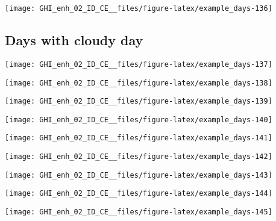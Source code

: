 \documentclass[
  10pt,
  a4paper,oneside]{article}
\begin{document}
\begin{center}\texttt{[image: GHI\_enh\_02\_ID\_CE\_\_files/figure-latex/example\_days-136]} \end{center}

\FloatBarrier

\hypertarget{days-with-cloudy-day}{%
\subsection{Days with cloudy day}\label{days-with-cloudy-day}}

\begin{center}\texttt{[image: GHI\_enh\_02\_ID\_CE\_\_files/figure-latex/example\_days-137]} \end{center}

\begin{center}\texttt{[image: GHI\_enh\_02\_ID\_CE\_\_files/figure-latex/example\_days-138]} \end{center}

\begin{center}\texttt{[image: GHI\_enh\_02\_ID\_CE\_\_files/figure-latex/example\_days-139]} \end{center}

\begin{center}\texttt{[image: GHI\_enh\_02\_ID\_CE\_\_files/figure-latex/example\_days-140]} \end{center}

\begin{center}\texttt{[image: GHI\_enh\_02\_ID\_CE\_\_files/figure-latex/example\_days-141]} \end{center}

\begin{center}\texttt{[image: GHI\_enh\_02\_ID\_CE\_\_files/figure-latex/example\_days-142]} \end{center}

\begin{center}\texttt{[image: GHI\_enh\_02\_ID\_CE\_\_files/figure-latex/example\_days-143]} \end{center}

\begin{center}\texttt{[image: GHI\_enh\_02\_ID\_CE\_\_files/figure-latex/example\_days-144]} \end{center}

\begin{center}\texttt{[image: GHI\_enh\_02\_ID\_CE\_\_files/figure-latex/example\_days-145]} \end{center}
\end{document}
